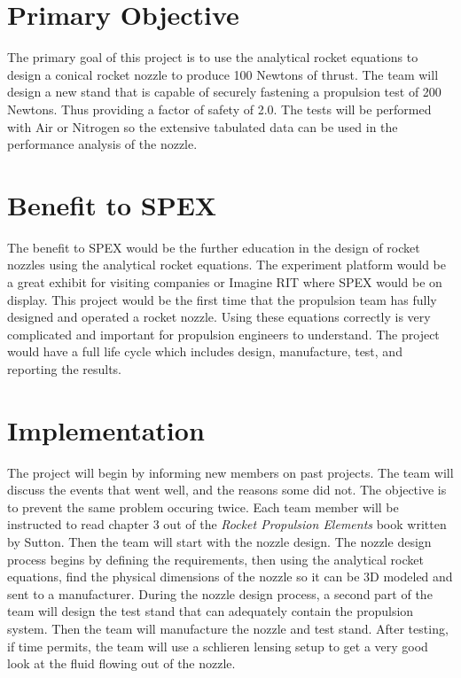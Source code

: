 \documentclass[conference]{IEEEtran} %
\begin{document}
\section{Primary Objective}\label{sec:primary-obj}
The primary goal of this project is to use the analytical rocket equations to design a conical rocket nozzle to produce 100 Newtons of thrust.
The team will design a new stand that is capable of securely fastening a propulsion test of 200 Newtons.
Thus providing a factor of safety of 2.0. The tests will be performed with Air or Nitrogen so the extensive tabulated data can be used in the performance analysis of the nozzle.

\section{Benefit to SPEX}\label{sec:benefit}
The benefit to SPEX would be the further education in the design of rocket nozzles using the analytical rocket equations. The experiment platform would
be a great exhibit for visiting companies or Imagine RIT where SPEX would be on display. This project would be
the first time that the propulsion team has fully designed and operated a rocket nozzle. Using these equations correctly is very complicated and important for
propulsion engineers to understand. The project would have a full life cycle which includes design, manufacture, test, and reporting the results.

\section{Implementation}\label{sec:implementation}
The project will begin by informing new members on past projects. The team will discuss the events that went well, and the reasons some did not. The objective is to prevent
the same problem occuring twice. Each team member will be instructed to read chapter 3 out of the \textit{Rocket Propulsion Elements} book written by Sutton.
Then the team will start with the nozzle design. The nozzle design process begins by defining the requirements, then using the analytical rocket equations, find the
physical dimensions of the nozzle so it can be 3D modeled and sent to a manufacturer. During the nozzle design process, a second part of the team will design the test stand that can adequately contain the
propulsion system. Then the team will manufacture the nozzle and test stand. After testing, if time permits, the team will use a schlieren lensing setup to
get a very good look at the fluid flowing out of the nozzle.
\end{document}
